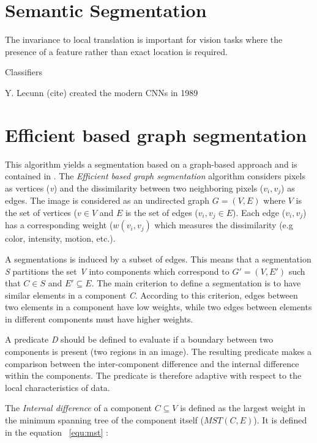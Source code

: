 \section{Semantic Segmentation}
\label{sec:secseg}

The invariance to local translation is important for vision tasks where the presence of a feature  rather than exact location is required.

Classifiers

Y. Lecunn (cite) created the modern CNNs in 1989

\section{Efficient based graph segmentation}
\label{sec:effi}
This algorithm yields a segmentation based on a graph-based approach and is contained in \textcite{felzenszwalb2004efficient}. The \textit{Efficient based graph segmentation} algorithm considers pixels as vertices (\textit{v}) and the dissimilarity between two  neighboring pixels (\(v_{i} , v_{j}\)) as edges. The image is considered as an undirected graph \(G = (V,E)\) where \(V\) is the set of vertices (\(v \in V\) and \(E\) is the set of edges (\(v_{i} , v_{j}\in E\)). Each edge (\(v_{i} , v_{j}\)) has a corresponding weight (\(w(v_{i} , v_{j})\) which measures the dissimilarity (e.g color, intensity, motion, etc.).

A segmentations is induced by a subset of edges. This means that a segmentation \textit{S} partitions the set \textit{V} into components which correspond to \(G'=(V,E')\) such that \(C \in S\) and \(E' \subseteq E\). The main criterion to define a segmentation is to have similar elements in a component \textit{C}. According to this criterion, edges between two elements in a component have low weights, while two edges between elements in different components must have higher weights.

A predicate \textit{D} should be defined to evaluate if a boundary between two components is present (two regions in an image). The resulting predicate makes a comparison between the inter-component difference and the internal difference within the components. The predicate is therefore adaptive with respect to the local characteristics of data.

The \textit{Internal difference} of a component \(C \subseteq V\) is defined as the largest weight in the minimum spanning tree of the component itself (\(MST(C,E)\)). It is defined in the equation ~\ref{equ:mst} :

